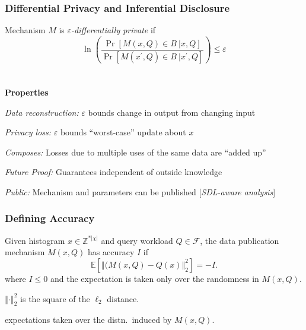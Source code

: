 \begin{frame}[allowframebreaks]%
	\frametitle{Differential Privacy and Inferential Disclosure}
	Mechanism $M$ is \emph{$\varepsilon$-differentially private} if
		\begin{equation*}
		\ln\left(\frac{\Pr \left[ M(x,Q)\in B \ |x,Q\right]}{\Pr \left[
			M(x^{\prime },Q)\in B \ |x^{\prime},Q\right]}\right)
			 \leq \varepsilon 
	    \end{equation*}%
	 \footnotesize \color{darkgray} 
	 \color{black}\normalsize \\
	 \ \\
	\textbf{Properties}
	\begin{wideitemize}
	    \item \emph{Data reconstruction:} $\varepsilon$ bounds change in output from changing input
	    \item \emph{Privacy loss:} $\varepsilon$ bounds ``worst-case'' update about $x$
	    \item \emph{Composes:} Losses due to multiple uses of the same data are ``added up''
	    \item \emph{Future Proof:} Guarantees independent of outside knowledge
	    \item \emph{Public:} Mechanism and parameters can be published [\emph{SDL-aware analysis}]
	\end{wideitemize}
\end{frame}%

\begin{frame}[allowframebreaks]%
  \frametitle{Defining Accuracy}
\begin{definition}[Accuracy ($I$)]
  \label{def:accuracy}
  Given histogram $x \in \mathbb{Z}^{\ast |\chi |}$ and query workload $Q \in  \mathcal{F}$, the data publication mechanism $M(x,Q)$ has accuracy $I$ if
  $$\mathbb{E}\left[\left\Vert(M(x,Q) - Q(x)\right\Vert^{2}_{2}\right] = -I.$$ where $I\le 0$ and the expectation is taken only over the randomness in $M(x,Q)$.
\end{definition}
\begin{wideitemize}
  \item $\left\Vert\cdot\right\Vert^{2}_{2}$ is the square of the $\ell_{2}$ distance.
  \item expectations taken over the distn.\ induced by $M(x,Q)$.
\end{wideitemize}

\end{frame}%

